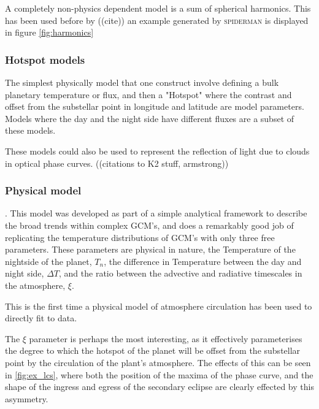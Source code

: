 \documentclass[a4paper,fleqn,usenatbib]{mnras}
\begin{document}
A completely non-physics dependent model is a sum of spherical harmonics. This has been used before by ((cite)) an example generated by \textsc{spiderman} is displayed in figure \ref{fig:harmonics}

\subsubsection{Hotspot models}

The simplest physically model that one construct involve defining a bulk planetary temperature or flux, and then a "Hotspot" where the contrast and offset from the substellar point in longitude and latitude are model parameters. Models where the day and the night side have different fluxes are a subset of these models.

These models could also be used to represent the reflection of light due to clouds in optical phase curves. ((citations to K2 stuff, armstrong))

\subsubsection{Physical model}

\citet{Zhang2016}. This model was developed as part of a simple analytical framework to describe the broad trends within complex GCM's, and does a remarkably good job of replicating the temperature distributions of GCM's with only three free parameters. These parameters are physical in nature, the Temperature of the nightside of the planet, $T_n$, the difference in Temperature between the day and night side, $\Delta T$, and the ratio between the advective and radiative timescales in the atmosphere, $\xi$.

This is the first time a physical model of atmosphere circulation has been used to directly fit to data.

The $\xi$ parameter is perhaps the most interesting, as it effectively parameterises the degree to which the hotspot of the planet will be offset from the substellar point by the circulation of the plant's atmosphere. The effects of this can be seen in \ref{fig:ex_lcs}, where both the position of the maxima of the phase curve, and the shape of the ingress and egress of the secondary eclipse are clearly effected by this asymmetry.
\end{document}
